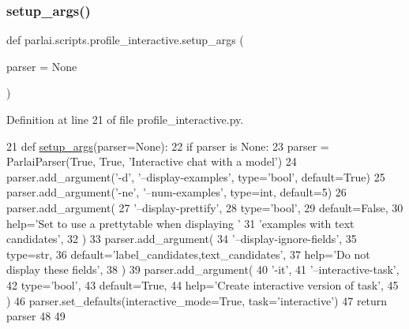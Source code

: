 \mbox{\label{namespaceparlai_1_1scripts_1_1profile__interactive_ae1f4afb65e0f6c7679baa3af43c3eda0}} 
\subsubsection{\texorpdfstring{setup\+\_\+args()}{setup\_args()}}
{\footnotesize\ttfamily def parlai.\+scripts.\+profile\+\_\+interactive.\+setup\+\_\+args (\begin{DoxyParamCaption}\item[{}]{parser = {\ttfamily None} }\end{DoxyParamCaption})}



Definition at line 21 of file profile\+\_\+interactive.\+py.


\begin{DoxyCode}
21 \textcolor{keyword}{def }\hyperlink{namespaceparlai_1_1scripts_1_1profile__interactive_ae1f4afb65e0f6c7679baa3af43c3eda0}{setup\_args}(parser=None):
22     \textcolor{keywordflow}{if} parser \textcolor{keywordflow}{is} \textcolor{keywordtype}{None}:
23         parser = ParlaiParser(\textcolor{keyword}{True}, \textcolor{keyword}{True}, \textcolor{stringliteral}{'Interactive chat with a model'})
24     parser.add\_argument(\textcolor{stringliteral}{'-d'}, \textcolor{stringliteral}{'--display-examples'}, type=\textcolor{stringliteral}{'bool'}, default=\textcolor{keyword}{True})
25     parser.add\_argument(\textcolor{stringliteral}{'-ne'}, \textcolor{stringliteral}{'--num-examples'}, type=int, default=5)
26     parser.add\_argument(
27         \textcolor{stringliteral}{'--display-prettify'},
28         type=\textcolor{stringliteral}{'bool'},
29         default=\textcolor{keyword}{False},
30         help=\textcolor{stringliteral}{'Set to use a prettytable when displaying '}
31         \textcolor{stringliteral}{'examples with text candidates'},
32     )
33     parser.add\_argument(
34         \textcolor{stringliteral}{'--display-ignore-fields'},
35         type=str,
36         default=\textcolor{stringliteral}{'label\_candidates,text\_candidates'},
37         help=\textcolor{stringliteral}{'Do not display these fields'},
38     )
39     parser.add\_argument(
40         \textcolor{stringliteral}{'-it'},
41         \textcolor{stringliteral}{'--interactive-task'},
42         type=\textcolor{stringliteral}{'bool'},
43         default=\textcolor{keyword}{True},
44         help=\textcolor{stringliteral}{'Create interactive version of task'},
45     )
46     parser.set\_defaults(interactive\_mode=\textcolor{keyword}{True}, task=\textcolor{stringliteral}{'interactive'})
47     \textcolor{keywordflow}{return} parser
48 
49 
\end{DoxyCode}


